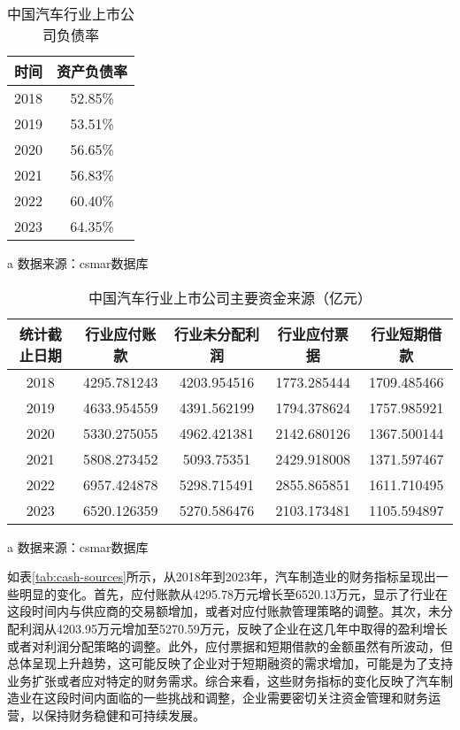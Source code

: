 \begin{table}
  \centering
  \begin{threeparttable}[c]
    \caption{中国汽车行业上市公司负债率}
    \label{tab:rates}
    \begin{tabular}{cc}
      \toprule
      时间    & 资产负债率   \\
      \midrule
        2018 & 52.85\% \\ 
        2019 & 53.51\% \\ 
        2020 & 56.65\% \\ 
        2021 & 56.83\% \\ 
        2022 & 60.40\% \\ 
        2023 & 64.35\% \\ 
      \bottomrule
    \end{tabular}
    \begin{tablenotes}
      \item [a] 数据来源：csmar数据库
    \end{tablenotes}
  \end{threeparttable}
\end{table}
\begin{table}
  \centering
  \begin{threeparttable}[c]
    \caption{中国汽车行业上市公司主要资金来源（亿元）}
    \label{tab:cash-sources}
    \begin{tabular}{ccccc}
      \toprule
        统计截止日期 & 行业应付账款 & 行业未分配利润 & 行业应付票据 & 行业短期借款 \\ 
      \midrule
        2018 & 4295.781243 & 4203.954516 & 1773.285444 & 1709.485466 \\ 
        2019 & 4633.954559 & 4391.562199 & 1794.378624 & 1757.985921 \\ 
        2020 & 5330.275055 & 4962.421381 & 2142.680126 & 1367.500144 \\ 
        2021 & 5808.273452 & 5093.75351 & 2429.918008 & 1371.597467 \\ 
        2022 & 6957.424878 & 5298.715491 & 2855.865851 & 1611.710495 \\ 
        2023 & 6520.126359 & 5270.586476 & 2103.173481 & 1105.594897 \\ 
      \bottomrule
    \end{tabular}
    \begin{tablenotes}
      \item [a] 数据来源：csmar数据库
    \end{tablenotes}
  \end{threeparttable}
\end{table}
如表\eqref{tab:cash-sources}所示，从2018年到2023年，汽车制造业的财务指标呈现出一些明显的变化。首先，应付账款从4295.78万元增长至6520.13万元，显示了行业在这段时间内与供应商的交易额增加，或者对应付账款管理策略的调整。其次，未分配利润从4203.95万元增加至5270.59万元，反映了企业在这几年中取得的盈利增长或者对利润分配策略的调整。此外，应付票据和短期借款的金额虽然有所波动，但总体呈现上升趋势，这可能反映了企业对于短期融资的需求增加，可能是为了支持业务扩张或者应对特定的财务需求。综合来看，这些财务指标的变化反映了汽车制造业在这段时间内面临的一些挑战和调整，企业需要密切关注资金管理和财务运营，以保持财务稳健和可持续发展。

